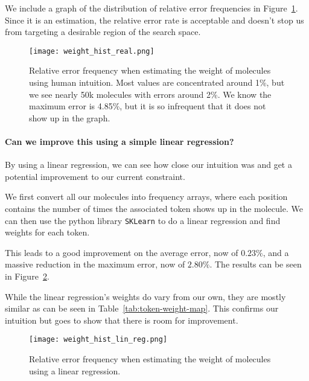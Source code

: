 \documentclass[../Document.tex]{subfiles}
\begin{document}
We include a graph of the distribution of relative error frequencies in Figure~\ref{fig:initial-weight-estimation}. Since it is an estimation, the relative error rate is acceptable and doesn't stop us from targeting a desirable region of the search space.

\begin{figure}[ht]
    \centering
    \texttt{[image: weight\_hist\_real.png]}
    \caption[Relative error frequency when estimating the weight of molecules using human intuition]{Relative error frequency when estimating the weight of molecules using human intuition. Most values are concentrated around 1\%, but we see nearly 50k molecules with errors around 2\%. We know the maximum error is 4.85\%, but it is so infrequent that it does not show up in the graph.}
    \label{fig:initial-weight-estimation}
\end{figure}

\paragraph{Can we improve this using a simple linear regression?}
By using a linear regression, we can see how close our intuition was and get a potential improvement to our current constraint.

We first convert all our molecules into frequency arrays, where each position contains the number of times the associated token shows up in the molecule. We can then use the python library \texttt{SKLearn} to do a linear regression and find weights for each token.

This leads to a good improvement on the average error, now of $0.23\%$, and a massive reduction in the maximum error, now of $2.80\%$. The results can be seen in Figure~\ref{fig:linreg-weight-estimation}.

While the linear regression's weights do vary from our own, they are mostly similar as can be seen in Table~\ref{tab:token-weight-map}. This confirms our intuition but goes to show that there is room for improvement.

\begin{figure}[ht]
    \centering
    \texttt{[image: weight\_hist\_lin\_reg.png]}
    \caption[Relative error frequency when estimating the weight of molecules using a linear regression]{Relative error frequency when estimating the weight of molecules using a linear regression.}
    \label{fig:linreg-weight-estimation}
\end{figure}
\end{document}
